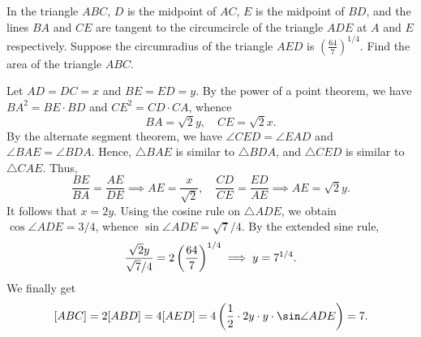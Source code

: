 \begin{question}[7]\label{Q::2023-O-1-21}
    In the triangle $ABC$, $D$ is the midpoint of $AC$, $E$ is the midpoint of $BD$, and the lines $BA$ and $CE$ are tangent to the circumcircle of the triangle $ADE$ at $A$ and $E$ respectively. Suppose the circumradius of the triangle $AED$ is $(\frac{64}{7})^{1/4}$. Find the area of the triangle $ABC$.
\end{question}
\begin{center}
\end{center}
\begin{solution*}
    Let $AD = DC = x$ and $BE = ED = y$. By the power of a point theorem, we have $BA^2 = BE \cdot BD$ and $CE^2 = CD \cdot CA$, whence \[BA = \sqrt{2}y, \quad CE = \sqrt{2}x.\] By the alternate segment theorem, we have $\angle CED = \angle EAD$ and $\angle BAE = \angle BDA$. Hence, $\triangle BAE$ is similar to $\triangle BDA$, and $\triangle CED$ is similar to $\triangle CAE$. Thus, \[\frac{BE}{BA} = \frac{AE}{DE} \implies AE = \frac{x}{\sqrt2}, \quad \frac{CD}{CE} = \frac{ED}{AE} \implies AE = \sqrt{2}y.\] It follows that $x = 2y$. Using the cosine rule on $\triangle ADE$, we obtain $\cos \angle ADE = 3/4$, whence $\sin \angle ADE = \sqrt{7}/4$. By the extended sine rule, \[\frac{\sqrt{2}y}{\sqrt{7}/{4}} = 2\left( \frac{64}{7} \right)^{1/4} \implies y = 7^{1/4}.\] We finally get \[[ABC] = 2[ABD] = 4[AED] = 4 \bp{\frac12 \cdot 2y \cdot y \cdot \sin \angle ADE} = 7.\]
\end{solution*}

